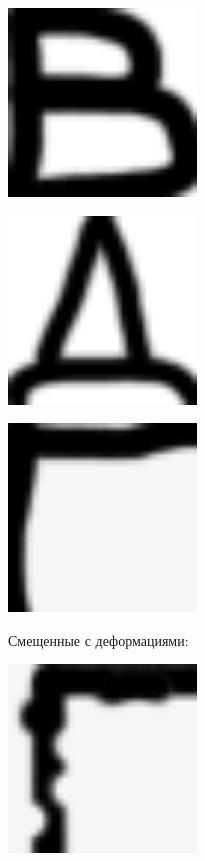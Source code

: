 \begin{center}
	\includegraphics[width=5cm]{image_for_report/sample_v_2.bmp}
\end{center}

\begin{center}
	\includegraphics[width=5cm]{image_for_report/sample_d.bmp}
\end{center}

\begin{center}
	\includegraphics[width=5cm]{image_for_report/sample_g.bmp}
\end{center}

Смещенные с деформациями:
\begin{center}
	\includegraphics[width=5cm]{image_for_report/sample_g_2.bmp}
\end{center}

